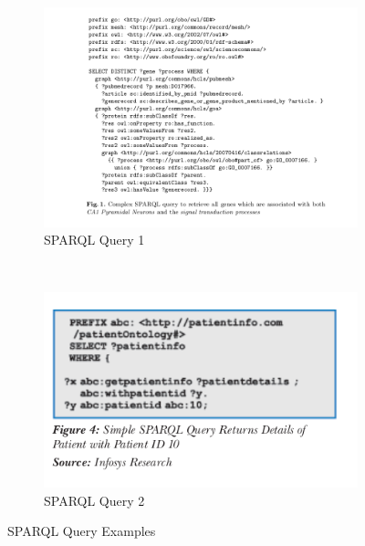   \begin{figure}[h!]
    \begin{subfigure}[b]{.5\linewidth}
      \includegraphics[width=1.2\textwidth]{sparql1.png}
      \caption{SPARQL Query 1~\citep{stenzhorn2008simplifying}}
      \label{fig:first}
    \end{subfigure}
    ~
    \begin{subfigure}[b]{.5\linewidth}
      \includegraphics[width=1.2\textwidth]{sparqlh.png}
      \caption{SPARQL Query 2~ \citep{parachuri2008role}}
      \label{fig:second}
    \end{subfigure}
    \caption{SPARQL Query Examples}
    \label{fig:sparql_examples}
  \end{figure}

